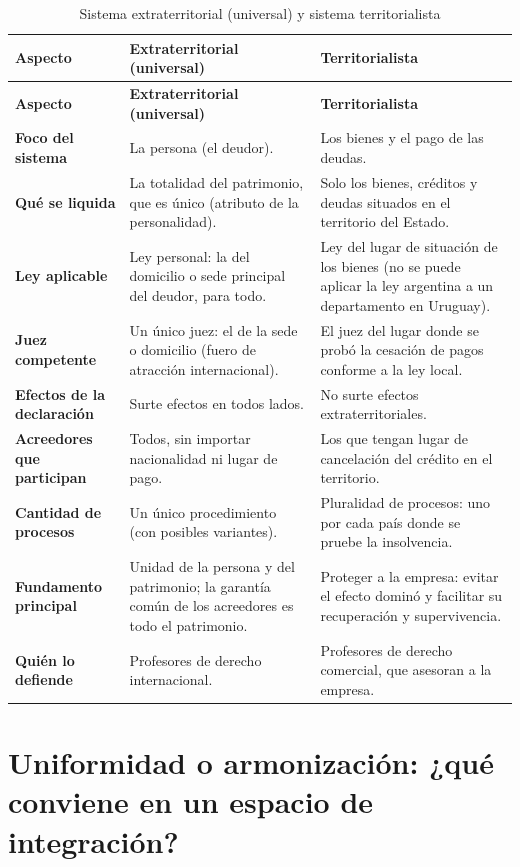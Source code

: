 \documentclass[12pt,oneside]{book}
\begin{document}
\begin{longtable}{>{\raggedright\arraybackslash}p{} >{\raggedright\arraybackslash}p{} >{\raggedright\arraybackslash}p{}}
\caption{Sistema extraterritorial (universal) y sistema territorialista}\\
\toprule
\textbf{Aspecto} & \textbf{Extraterritorial (universal)} & \textbf{Territorialista} \\
\midrule
\endfirsthead
\toprule
\textbf{Aspecto} & \textbf{Extraterritorial (universal)} & \textbf{Territorialista} \\
\midrule
\endhead
\bottomrule
\endlastfoot
\textbf{Foco del sistema} & La persona (el deudor). & Los bienes y el pago de las deudas. \\
\textbf{Qué se liquida} & La totalidad del patrimonio, que es único (atributo de la personalidad). & Solo los bienes, créditos y deudas situados en el territorio del Estado. \\
\textbf{Ley aplicable} & Ley personal: la del domicilio o sede principal del deudor, para todo. & Ley del lugar de situación de los bienes (no se puede aplicar la ley argentina a un departamento en Uruguay). \\
\textbf{Juez competente} & Un único juez: el de la sede o domicilio (fuero de atracción internacional). & El juez del lugar donde se probó la cesación de pagos conforme a la ley local. \\
\textbf{Efectos de la declaración} & Surte efectos en todos lados. & No surte efectos extraterritoriales. \\
\textbf{Acreedores que participan} & Todos, sin importar nacionalidad ni lugar de pago. & Los que tengan lugar de cancelación del crédito en el territorio. \\
\textbf{Cantidad de procesos} & Un único procedimiento (con posibles variantes). & Pluralidad de procesos: uno por cada país donde se pruebe la insolvencia. \\
\textbf{Fundamento principal} & Unidad de la persona y del patrimonio; la garantía común de los acreedores es todo el patrimonio. & Proteger a la empresa: evitar el efecto dominó y facilitar su recuperación y supervivencia. \\
\textbf{Quién lo defiende} & Profesores de derecho internacional. & Profesores de derecho comercial, que asesoran a la empresa. \\
\end{longtable}

\section{Uniformidad o armonización: ¿qué conviene en un espacio de integración?}
\end{document}
